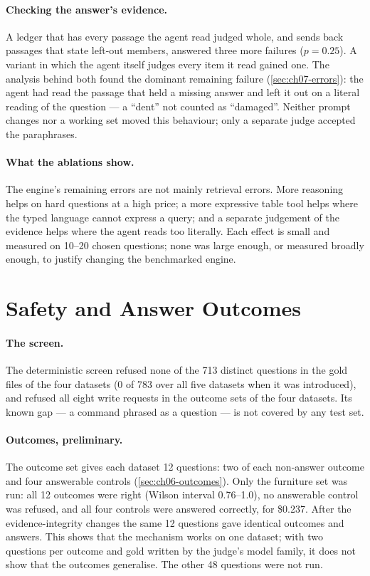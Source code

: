 \paragraph{Checking the answer's evidence.} A ledger that has every passage the agent read judged whole, and sends
back passages that state left-out members, answered three more failures ($p = 0.25$). A variant in which the agent
itself judges every item it read gained one. The analysis behind both found the dominant remaining failure
(\cref{sec:ch07-errors}): the agent had read the passage that held a missing answer and left it out on a literal
reading of the question --- a ``dent'' not counted as ``damaged''. Neither prompt changes nor a working set moved this
behaviour; only a separate judge accepted the paraphrases.

\paragraph{What the ablations show.} The engine's remaining errors are not mainly retrieval errors. More reasoning
helps on hard questions at a high price; a more expressive table tool helps where the typed language cannot express a
query; and a separate judgement of the evidence helps where the agent reads too literally. Each effect is small and
measured on 10--20 chosen questions; none was large enough, or measured broadly enough, to justify changing the
benchmarked engine.

\section{Safety and Answer Outcomes}\label{sec:ch07-safety}

\paragraph{The screen.} The deterministic screen refused none of the 713 distinct questions in the gold files of the
four datasets (0 of 783 over all five datasets when it was introduced), and refused all eight write requests in the
outcome sets of the four datasets. Its known gap --- a command phrased as a question --- is not covered by any test set.

\paragraph{Outcomes, preliminary.} The outcome set gives each dataset 12 questions: two of each non-answer outcome and
four answerable controls (\cref{sec:ch06-outcomes}). Only the furniture set was run: all 12 outcomes were right (Wilson
interval 0.76--1.0), no answerable control was refused, and all four controls were answered correctly, for \$0.237.
After the evidence-integrity changes the same 12 questions gave identical outcomes and answers. This shows that the
mechanism works on one dataset; with two questions per outcome and gold written by the judge's model family, it does
not show that the outcomes generalise. The other 48 questions were not run.

